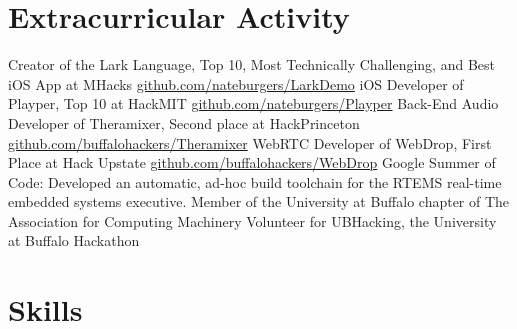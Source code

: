\documentclass[11pt,a4paper,sans]{moderncv}   %
\begin{document}
\section{Extracurricular Activity}
 {Creator of the Lark Language, Top 10, Most Technically Challenging, and Best iOS App at MHacks \newline \url{github.com/nateburgers/LarkDemo}}
 {iOS Developer of Playper, Top 10 at HackMIT \newline \url{github.com/nateburgers/Playper}}
 {Back-End Audio Developer of Theramixer, Second place at HackPrinceton \newline \url{github.com/buffalohackers/Theramixer}}
 {WebRTC Developer of WebDrop, First Place at Hack Upstate \newline \url{github.com/buffalohackers/WebDrop}}
 {Google Summer of Code: Developed an automatic, ad-hoc build toolchain for the RTEMS real-time embedded systems executive.}
 {Member of the University at Buffalo chapter of The Association for Computing Machinery}
 {Volunteer for UBHacking, the University at Buffalo Hackathon}

\section{Skills}
\end{document}
